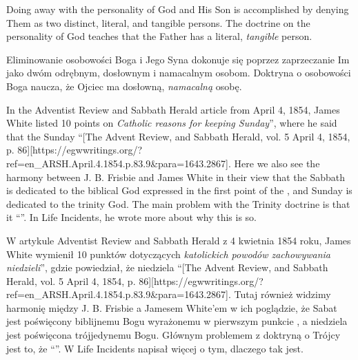 Doing away with the personality of God and His Son is accomplished by denying Them as two distinct, literal, and tangible persons. The doctrine on the personality of God teaches that the Father has a literal, \textit{tangible} person.


Eliminowanie osobowości Boga i Jego Syna dokonuje się poprzez zaprzeczanie Im jako dwóm odrębnym, dosłownym i namacalnym osobom. Doktryna o osobowości Boga naucza, że Ojciec ma dosłowną, \textit{namacalną} osobę.


In the Adventist Review and Sabbath Herald article from April 4, 1854, James White listed 10 points on \textit{Catholic reasons for keeping Sunday}”, where he said that the Sunday “[The Advent Review, and Sabbath Herald, vol. 5 April 4, 1854, p. 86][https://egwwritings.org/?ref=en\_ARSH.April.4.1854.p.83.9&para=1643.2867]. Here we also see the harmony between J. B. Frisbie and James White in their view that the Sabbath is dedicated to the biblical God expressed in the first point of the , and Sunday is dedicated to the trinity God. The main problem with the Trinity doctrine is that it “”. In Life Incidents, he wrote more about why this is so.


W artykule Adventist Review and Sabbath Herald z 4 kwietnia 1854 roku, James White wymienił 10 punktów dotyczących \textit{katolickich powodów zachowywania niedzieli}”, gdzie powiedział, że niedziela “[The Advent Review, and Sabbath Herald, vol. 5 April 4, 1854, p. 86][https://egwwritings.org/?ref=en\_ARSH.April.4.1854.p.83.9&para=1643.2867]. Tutaj również widzimy harmonię między J. B. Frisbie a Jamesem White'em w ich poglądzie, że Sabat jest poświęcony biblijnemu Bogu wyrażonemu w pierwszym punkcie , a niedziela jest poświęcona trójjedynemu Bogu. Głównym problemem z doktryną o Trójcy jest to, że “”. W Life Incidents napisał więcej o tym, dlaczego tak jest.


